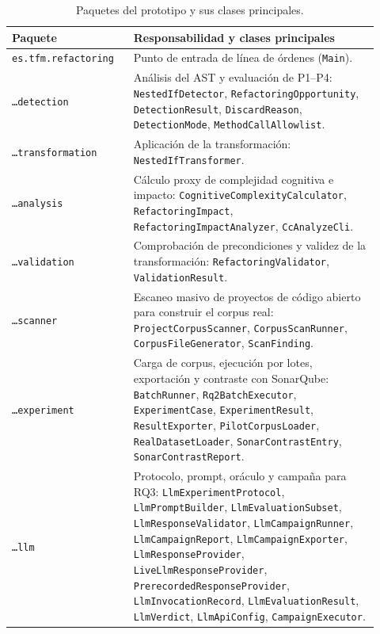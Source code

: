 \begin{longtable}{@{}p{0.30\linewidth}p{0.62\linewidth}@{}}
\caption{Paquetes del prototipo y sus clases principales.}\label{tab:paquetes-arq}\\
\toprule
\textbf{Paquete} & \textbf{Responsabilidad y clases principales} \\
\midrule
\endhead
\texttt{es.tfm.refactoring} & Punto de entrada de línea de órdenes
(\texttt{Main}). \\
\texttt{\dots detection} & Análisis del AST y evaluación de P1--P4:
\texttt{NestedIfDetector}, \texttt{RefactoringOpportunity},
\texttt{DetectionResult}, \texttt{DiscardReason}, \texttt{DetectionMode},
\texttt{MethodCallAllowlist}. \\
\texttt{\dots transformation} & Aplicación de la transformación:
\texttt{NestedIfTransformer}. \\
\texttt{\dots analysis} & Cálculo proxy de complejidad cognitiva e impacto:
\texttt{Cognitive\allowbreak Complexity\allowbreak Calculator}, \texttt{RefactoringImpact},
\texttt{RefactoringImpactAnalyzer}, \texttt{CcAnalyzeCli}. \\
\texttt{\dots validation} & Comprobación de precondiciones y validez de la
transformación: \texttt{RefactoringValidator}, \texttt{ValidationResult}. \\
\texttt{\dots scanner} & Escaneo masivo de proyectos de código abierto para
construir el corpus real: \texttt{ProjectCorpusScanner},
\texttt{CorpusScanRunner}, \texttt{CorpusFileGenerator}, \texttt{ScanFinding}. \\
\texttt{\dots experiment} & Carga de corpus, ejecución por lotes,
exportación y contraste con SonarQube: \texttt{BatchRunner},
\texttt{Rq2BatchExecutor}, \texttt{ExperimentCase},
\texttt{ExperimentResult}, \texttt{ResultExporter},
\texttt{PilotCorpusLoader}, \texttt{RealDatasetLoader},
\texttt{SonarContrastEntry}, \texttt{SonarContrastReport}. \\
\texttt{\dots llm} & Protocolo, prompt, oráculo y campaña para RQ3:
\texttt{LlmExperimentProtocol}, \texttt{LlmPromptBuilder},
\texttt{LlmEvaluationSubset}, \texttt{LlmResponseValidator},
\texttt{LlmCampaignRunner}, \texttt{LlmCampaignReport},
\texttt{LlmCampaignExporter}, \texttt{LlmResponseProvider},
\texttt{LiveLlmResponseProvider}, \texttt{PrerecordedResponseProvider},
\texttt{LlmInvocationRecord}, \texttt{LlmEvaluationResult},
\texttt{LlmVerdict}, \texttt{LlmApiConfig}, \texttt{CampaignExecutor}. \\
\bottomrule
\end{longtable}

